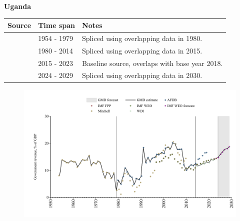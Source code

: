 \documentclass[12pt,a4paper,landscape]{article}
\begin{document}
\begin{adjustbox}{max totalsize={\paperwidth}{\paperheight},center}
\begin{minipage}[t][\textheight][t]{\textwidth}
\vspace*{0.5cm}
{}
\begin{center}
{\Large\bfseries Uganda}
\end{center}
\vspace{0.5cm}
\begin{table}[H]
\centering
\small
\begin{tabular}{|l|l|l|}
\hline
\textbf{Source} & \textbf{Time span} & \textbf{Notes} \\
\hline
\rowcolor{white}\cite{Mitchell}& 1954 - 1979 &Spliced using overlapping data in 1980.\\
\rowcolor{lightgray}\cite{AFDB}& 1980 - 2014 &Spliced using overlapping data in 2015.\\
\rowcolor{white}\cite{WDI}& 2015 - 2023 &Baseline source, overlaps with base year 2018.\\
\rowcolor{lightgray}\cite{IMF_WEO_forecast}& 2024 - 2029 &Spliced using overlapping data in 2030.\\
\hline
\end{tabular}
\end{table}
\begin{figure}[H]
\centering
\includegraphics[width=\textwidth,height=0.6\textheight,keepaspectratio]{graphs/UGA_govrev_GDP.pdf}
\end{figure}
\end{minipage}
\end{adjustbox}
\end{document}
